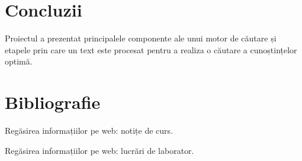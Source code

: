\documentclass[12pt]{article}
\begin{document}
\section{Concluzii}
Proiectul a prezentat principalele componente ale unui motor de căutare și etapele prin care un text este procesat pentru a realiza o căutare a cunoștințelor optimă.
\newpage
\section{Bibliografie}
\begin{thebibliography}{9}
	Regăsirea informațiilor pe web: notițe de curs.
	
	Regăsirea informațiilor pe web: lucrări de laborator.
\end{thebibliography}
\end{document}
